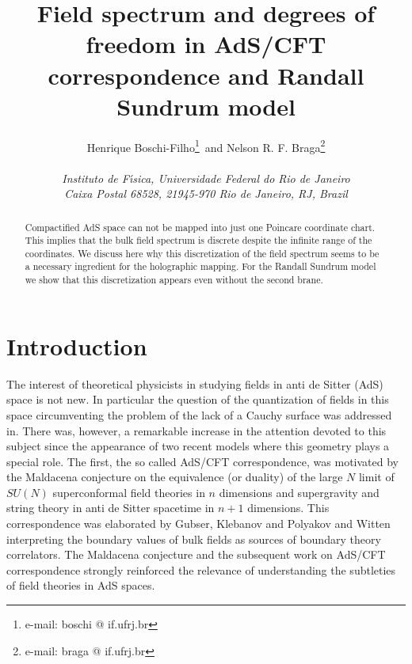 \documentclass[a4paper,12pt]{article}
\begin{document}
\baselineskip=20pt

\title{Field spectrum and degrees of freedom in  AdS/CFT correspondence
and Randall Sundrum model}


\author{\large Henrique Boschi-Filho\footnote{\noindent e-mail: 
boschi @ if.ufrj.br}\,  
and 
Nelson R. F. Braga\footnote{\noindent e-mail: braga @ if.ufrj.br}
\\ 
\\ 
\it Instituto de F\'\i sica, Universidade Federal do Rio de Janeiro\\
\it Caixa Postal 68528, 21945-970  Rio de Janeiro, RJ, Brazil}
 
\date{}

\maketitle

\vskip 3cm


\begin{abstract}  
Compactified AdS space can not be mapped into just one Poincare 
coordinate chart. This implies that the  bulk field spectrum 
is discrete despite the infinite range of the  coordinates.
We discuss here why this discretization of the field spectrum 
seems to be a necessary  ingredient for the holographic mapping.
For the Randall Sundrum model we show that this discretization 
appears even without the second brane. 

\end{abstract}



\vfill\eject

\section{Introduction}

The interest of theoretical physicists in studying fields in
anti de Sitter (AdS) space is not new\cite{Fro}.
In particular the question of the quantization of fields in this space
circumventing the problem of the lack of a Cauchy surface
was addressed in\cite{QAdS1,QAdS2}. 
There was, however, a remarkable increase in the attention devoted
to this subject since the appearance of  two recent models where this 
geometry plays a special role.
The first, the so called AdS/CFT correspondence,  was motivated 
by the Maldacena \cite{Malda} conjecture on the equivalence 
(or duality) of the large $N$ limit of $SU(N)$ superconformal 
field theories in $n$ dimensions and supergravity and 
string theory in anti de Sitter spacetime in $n+1$  dimensions. 
This correspondence was elaborated by  
Gubser, Klebanov and Polyakov \cite{GKP} and  Witten \cite{Wi}
interpreting the boundary values of bulk fields as sources of 
boundary theory correlators.
The Maldacena conjecture and the subsequent 
work on AdS/CFT correspondence\cite{Malda2}  strongly reinforced the
relevance of understanding  the subtleties of field theories in 
AdS spaces. 
\end{document}
